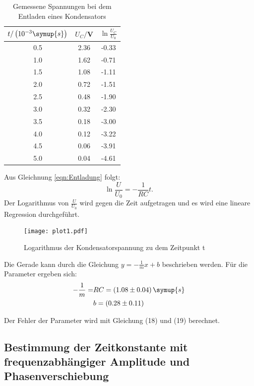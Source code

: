 \begin{table}[H]
  \centering
  \caption{Gemessene Spannungen bei dem Entladen eines Kondensators}
  \label{tab:Rechteckspannung}
  \begin{tabular}{c c c}
    \toprule
    $t/\left(10^{-3}\symup{s}\right)$ & $U_C/$V & $\ln{\frac{U_C}{U_0}}$ \\
    \midrule
    0.5 & 2.36 & -0.33 \\
    1.0 & 1.62 & -0.71 \\
    1.5 & 1.08 & -1.11 \\
    2.0 & 0.72 & -1.51 \\
    2.5 & 0.48 & -1.90 \\
    3.0 & 0.32 & -2.30 \\
    3.5 & 0.18 & -3.00 \\
    4.0 & 0.12 & -3.22 \\
    4.5 & 0.06 & -3.91 \\
    5.0 & 0.04 & -4.61 \\
    \bottomrule
  \end{tabular}
\end{table}

Aus Gleichnung \eqref{eqn:Entladung} folgt:
\begin{equation}
  \ln{\frac{U}{U_0}} = -\frac{1}{RC}t.
\end{equation}
Der Logarithmus von $\frac{U}{U_0}$ wird gegen die Zeit aufgetragen und es wird eine lineare Regression durchgeführt.



\begin{figure}[H]
  \centering
  \texttt{[image: plot1.pdf]}
  \caption{Logarithmus der Kondensatorspannung zu dem Zeitpunkt t}
  \label{fig:entladung}
\end{figure}

Die Gerade kann durch die Gleichung $y = -\frac{1}{m}x + b$ beschrieben werden. Für die Parameter ergeben sich:
\begin{align*}
  -\frac{1}{m} = &RC = (1.08 \pm 0.04) \, \symup{s} \\
  &b = (0.28 \pm 0.11)
\end{align*}

Der Fehler der Parameter wird mit Gleichung (18) und (19) berechnet.

\subsection{Bestimmung der Zeitkonstante mit frequenzabhängiger Amplitude und Phasenverschiebung}

